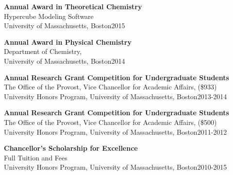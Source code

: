 \documentclass[letterpaper]{article}
\renewenvironment{itemize}{
  \begin{list}{}{
    \setlength{\leftmargin}{1.5em}
  }
}{
  \end{list}
}
\begin{document}
\begin{itemize}

\item \textbf{Annual Award in Theoretical Chemistry}\\
Hypercube Modeling Software\\
University of Massachusetts, Boston\hfill 2015




\item \textbf{Annual Award in Physical Chemistry}\\
Department of Chemistry,\\
University of Massachusetts, Boston\hfill 2014


\item \textbf{Annual Research Grant Competition for Undergraduate Students}\\
The Office of the Provost, Vice Chancellor for Academic Affairs, (\$933)\\
University Honors Program, University of Massachusetts, Boston\hfill 2013-2014


\item \textbf{Annual Research Grant Competition for Undergraduate Students}\\
The Office of the Provost, Vice Chancellor for Academic Affairs, (\$500)\\
University Honors Program, University of Massachusetts, Boston\hfill 2011-2012

\item \textbf{Chancellor's Scholarship for Excellence}\\
Full Tuition and Fees\\
University Honors Program, University of Massachusetts, Boston\hfill 2010-2015

\end{itemize}
\end{document}

